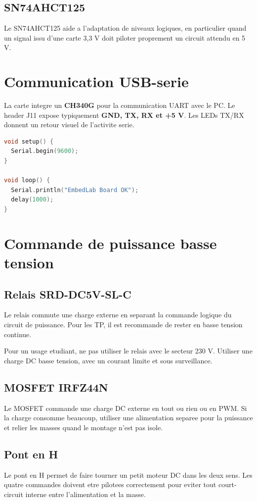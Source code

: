 \documentclass[11pt,a4paper]{article}
\begin{document}
\subsection{SN74AHCT125}
Le SN74AHCT125 aide a l'adaptation de niveaux logiques, en particulier quand un signal issu d'une carte 3,3 V doit piloter proprement un circuit attendu en 5 V.

\section{Communication USB-serie}
La carte integre un \textbf{CH340G} pour la communication UART avec le PC. Le header J11 expose typiquement \textbf{GND, TX, RX et +5 V}. Les LEDs TX/RX donnent un retour visuel de l'activite serie.

\begin{lstlisting}[language=C,caption={Test de communication serie}]
void setup() {
  Serial.begin(9600);
}

void loop() {
  Serial.println("EmbedLab Board OK");
  delay(1000);
}
\end{lstlisting}

\section{Commande de puissance basse tension}
\subsection{Relais SRD-DC5V-SL-C}
Le relais commute une charge externe en separant la commande logique du circuit de puissance. Pour les TP, il est recommande de rester en basse tension continue.

\begin{warningbox}
Pour un usage etudiant, ne pas utiliser le relais avec le secteur 230 V. Utiliser une charge DC basse tension, avec un courant limite et sous surveillance.
\end{warningbox}

\subsection{MOSFET IRFZ44N}
Le MOSFET commande une charge DC externe en tout ou rien ou en PWM. Si la charge consomme beaucoup, utiliser une alimentation separee pour la puissance et relier les masses quand le montage n'est pas isole.

\subsection{Pont en H}
Le pont en H permet de faire tourner un petit moteur DC dans les deux sens. Les quatre commandes doivent etre pilotees correctement pour eviter tout court-circuit interne entre l'alimentation et la masse.
\end{document}
